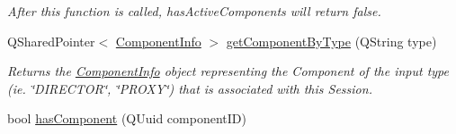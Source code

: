 \begin{DoxyCompactItemize}
\begin{DoxyCompactList}\small\item\em After this function is called, has\-Active\-Components will return false. \end{DoxyCompactList}\item 
\hypertarget{class_session_info_a099ea2f23c036f943cf6b6c424b6fa7d}{Q\-Shared\-Pointer$<$ \hyperlink{class_component_info}{Component\-Info} $>$ \hyperlink{class_session_info_a099ea2f23c036f943cf6b6c424b6fa7d}{get\-Component\-By\-Type} (Q\-String type)}\label{class_session_info_a099ea2f23c036f943cf6b6c424b6fa7d}

\begin{DoxyCompactList}\small\item\em Returns the \hyperlink{class_component_info}{Component\-Info} object representing the Component of the input type (ie. \char`\"{}\-D\-I\-R\-E\-C\-T\-O\-R\char`\"{}, \char`\"{}\-P\-R\-O\-X\-Y\char`\"{}) that is associated with this Session. \end{DoxyCompactList}\item 
\hypertarget{class_session_info_a559e8105862352d63f8cebe4479a751e}{bool \hyperlink{class_session_info_a559e8105862352d63f8cebe4479a751e}{has\-Component} (Q\-Uuid component\-I\-D)}\label{class_session_info_a559e8105862352d63f8cebe4479a751e}


\end{DoxyCompactItemize}
